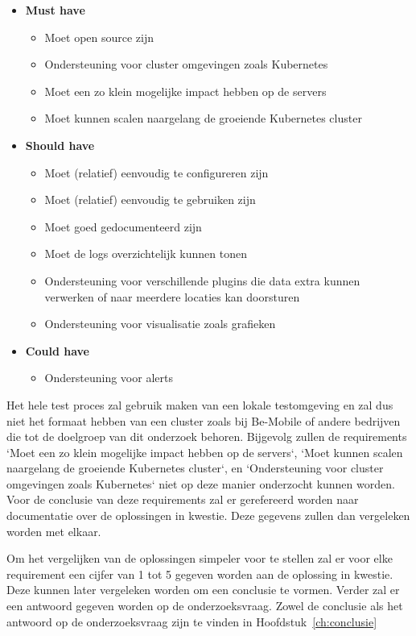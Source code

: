 \begin{itemize}
    \item \textbf{Must have}
    \begin{itemize}
        \item Moet open source zijn
        \item Ondersteuning voor cluster omgevingen zoals Kubernetes
        \item Moet een zo klein mogelijke impact hebben op de servers
        \item Moet kunnen scalen naargelang de groeiende Kubernetes cluster
    \end{itemize}
    \item \textbf{Should have}
    \begin{itemize}
        \item Moet (relatief) eenvoudig te configureren zijn
        \item Moet (relatief) eenvoudig te gebruiken zijn
        \item Moet goed gedocumenteerd zijn
        \item Moet de logs overzichtelijk kunnen tonen
        \item Ondersteuning voor verschillende plugins die data extra kunnen verwerken of naar meerdere locaties kan doorsturen
         \item Ondersteuning voor visualisatie zoals grafieken
    \end{itemize}
    \item \textbf{Could have}
    \begin{itemize}
       \item Ondersteuning voor alerts
    \end{itemize}
\end{itemize}

Het hele test proces zal gebruik maken van een lokale testomgeving en zal dus niet het formaat hebben van een cluster zoals bij Be-Mobile of andere bedrijven die tot de doelgroep van dit onderzoek behoren. Bijgevolg zullen de requirements `Moet een zo klein mogelijke impact hebben op de servers`, `Moet kunnen scalen naargelang de groeiende Kubernetes cluster`, en `Ondersteuning voor cluster omgevingen zoals Kubernetes` niet op deze manier onderzocht kunnen worden. Voor de conclusie van deze requirements zal er gerefereerd worden naar documentatie over de oplossingen in kwestie. Deze gegevens zullen dan vergeleken worden met elkaar. 

Om het vergelijken van de oplossingen simpeler voor te stellen zal er voor elke requirement een cijfer van 1 tot 5 gegeven worden aan de oplossing in kwestie. Deze kunnen later vergeleken worden om een conclusie te vormen. Verder zal er een antwoord gegeven worden op de onderzoeksvraag. Zowel de conclusie als het antwoord op de onderzoeksvraag zijn te vinden in Hoofdstuk~\ref{ch:conclusie}












